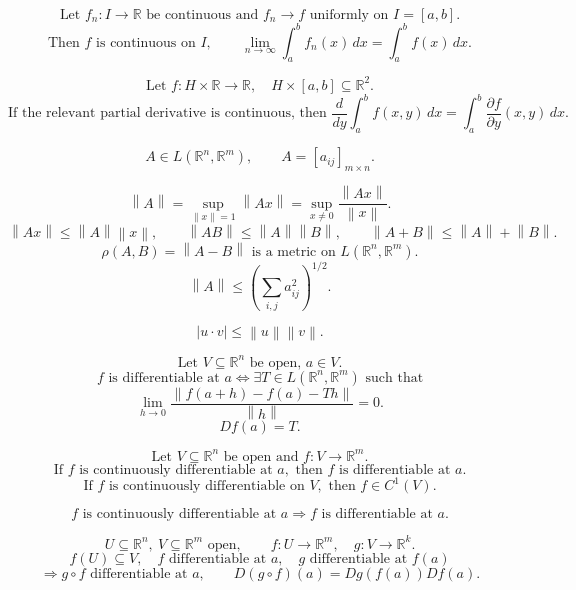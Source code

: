 \documentclass[11pt]{article}
\newcommand{\R}{\mathbb R}
\newcommand{\norm}[1]{\left\lVert #1\right\rVert}
\begin{document}
\[
\text{Let }f_n:I\to\R\text{ be continuous and }f_n\to f\text{ uniformly on }I=[a,b].
\]
\[
\text{Then }f\text{ is continuous on }I,\qquad
\lim_{n\to\infty}\int_a^b f_n(x)\,dx
=\int_a^b f(x)\,dx.
\]

\[
\text{Let }f:H\times\R\to\R,\quad H\times[a,b]\subseteq\R^2.
\]
\[
\text{If the relevant partial derivative is continuous, then }
\frac{d}{dy}\int_a^b f(x,y)\,dx
=\int_a^b \frac{\partial f}{\partial y}(x,y)\,dx.
\]


\[
A\in L(\R^n,\R^m),\qquad
A=[a_{ij}]_{m\times n}.
\]

\[
\norm{A}=\sup_{\norm{x}=1}\norm{Ax}
=\sup_{x\ne0}\frac{\norm{Ax}}{\norm{x}}.
\]
\[
\norm{Ax}\le\norm{A}\norm{x},\qquad
\norm{AB}\le\norm{A}\norm{B},\qquad
\norm{A+B}\le\norm{A}+\norm{B}.
\]
\[
\rho(A,B)=\norm{A-B}\text{ is a metric on }L(\R^n,\R^m).
\]
\[
\norm{A}\le\left(\sum_{i,j}a_{ij}^2\right)^{1/2}.
\]

\[
|u\cdot v|\le\norm{u}\norm{v}.
\]

\newpage


\[
\text{Let }V\subseteq\R^n\text{ be open, }a\in V.
\]
\[
f\text{ is differentiable at }a
\Longleftrightarrow
\exists T\in L(\R^n,\R^m)\text{ such that}
\]
\[
\lim_{h\to0}\frac{\norm{f(a+h)-f(a)-Th}}{\norm{h}}=0.
\]
\[
Df(a)=T.
\]

\[
\text{Let }V\subseteq\R^n\text{ be open and }f:V\to\R^m.
\]
\[
\text{If }f\text{ is continuously differentiable at }a,\text{ then }f\text{ is differentiable at }a.
\]
\[
\text{If }f\text{ is continuously differentiable on }V,\text{ then }f\in C^1(V).
\]

\[
f\text{ is continuously differentiable at }a
\Longrightarrow f\text{ is differentiable at }a.
\]

\[
U\subseteq\R^n,\ V\subseteq\R^m\text{ open},\qquad
f:U\to\R^m,\quad g:V\to\R^k.
\]
\[
f(U)\subseteq V,\quad f\text{ differentiable at }a,\quad g\text{ differentiable at }f(a)
\]
\[
\Longrightarrow
g\circ f\text{ differentiable at }a,\qquad
D(g\circ f)(a)=Dg(f(a))Df(a).
\]

\end{document}
